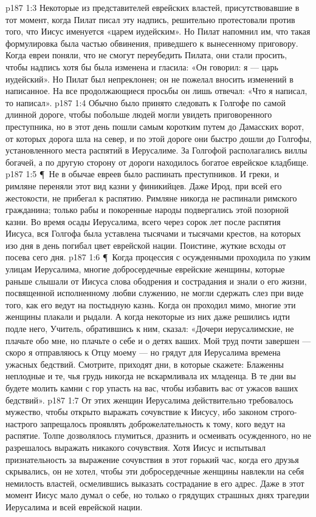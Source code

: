 \vs p187 1:3 Некоторые из представителей еврейских властей, присутствовавшие в тот момент, когда Пилат писал эту надпись, решительно протестовали против того, что Иисус именуется «царем иудейским». Но Пилат напомнил им, что такая формулировка была частью обвинения, приведшего к вынесенному приговору. Когда евреи поняли, что не смогут переубедить Пилата, они стали просить, чтобы надпись хотя бы была изменена и гласила: «Он говорил: я --- царь иудейский». Но Пилат был непреклонен; он не пожелал вносить изменений в написанное. На все продолжающиеся просьбы он лишь отвечал: «Что я написал, то написал».
\vs p187 1:4 Обычно было принято следовать к Голгофе по самой длинной дороге, чтобы побольше людей могли увидеть приговоренного преступника, но в этот день пошли самым коротким путем до Дамасских ворот, от которых дорога шла на север, и по этой дороге они быстро дошли до Голгофы, установленного места распятий в Иерусалиме. За Голгофой располагались виллы богачей, а по другую сторону от дороги находилось богатое еврейское кладбище.
\vs p187 1:5 \P\ Не в обычае евреев было распинать преступников. И греки, и римляне переняли этот вид казни у финикийцев. Даже Ирод, при всей его жестокости, не прибегал к распятию. Римляне никогда не распинали римского гражданина; только рабы и покоренные народы подвергались этой позорной казни. Во время осады Иерусалима, всего через сорок лет после распятия Иисуса, вся Голгофа была уставлена тысячами и тысячами крестов, на которых изо дня в день погибал цвет еврейской нации. Поистине, жуткие всходы от посева сего дня.
\vs p187 1:6 \P\ Когда процессия с осужденными проходила по узким улицам Иерусалима, многие добросердечные еврейские женщины, которые раньше слышали от Иисуса слова ободрения и сострадания и знали о его жизни, посвященной исполненному любви служению, не могли сдержать слез при виде того, как его ведут на постыдную казнь. Когда он проходил мимо, многие эти женщины плакали и рыдали. А когда некоторые из них даже решились идти подле него, Учитель, обратившись к ним, сказал: «Дочери иерусалимские, не плачьте обо мне, но плачьте о себе и о детях ваших. Мой труд почти завершен --- скоро я отправляюсь к Отцу моему --- но грядут для Иерусалима времена ужасных бедствий. Смотрите, приходят дни, в которые скажете: Блаженны неплодные и те, чья грудь никогда не вскармливала их младенца. В те дни вы будете молить камни с гор упасть на вас, чтобы избавить вас от ужасов ваших бедствий».
\vs p187 1:7 От этих женщин Иерусалима действительно требовалось мужество, чтобы открыто выражать сочувствие к Иисусу, ибо законом строго\hyp{}настрого запрещалось проявлять доброжелательность к тому, кого ведут на распятие. Толпе дозволялось глумиться, дразнить и осмеивать осужденного, но не разрешалось выражать никакого сочувствия. Хотя Иисус и испытывал признательность за выражение сочувствия в этот горький час, когда его друзья скрывались, он не хотел, чтобы эти добросердечные женщины навлекли на себя немилость властей, осмелившись выказать сострадание в его адрес. Даже в этот момент Иисус мало думал о себе, но только о грядущих страшных днях трагедии Иерусалима и всей еврейской нации.
